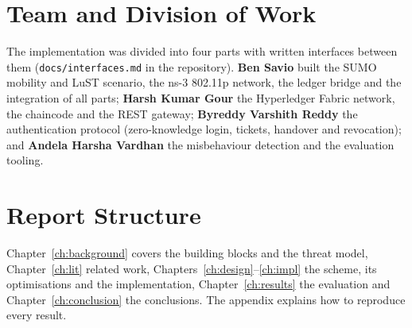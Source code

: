 \section{Team and Division of Work}

The implementation was divided into four parts with written interfaces between them
(\texttt{docs/interfaces.md} in the repository). \textbf{Ben Savio} built the SUMO mobility and LuST
scenario, the ns-3 802.11p network, the ledger bridge and the integration of all parts;
\textbf{Harsh Kumar Gour} the Hyperledger Fabric network, the chaincode and the REST gateway;
\textbf{Byreddy Varshith Reddy} the authentication protocol (zero-knowledge login, tickets, handover
and revocation); and \textbf{Andela Harsha Vardhan} the misbehaviour detection and the evaluation
tooling.

\section{Report Structure}

Chapter~\ref{ch:background} covers the building blocks and the threat model, Chapter~\ref{ch:lit}
related work, Chapters~\ref{ch:design}--\ref{ch:impl} the scheme, its optimisations and the
implementation, Chapter~\ref{ch:results} the evaluation and Chapter~\ref{ch:conclusion} the
conclusions. The appendix explains how to reproduce every result.
